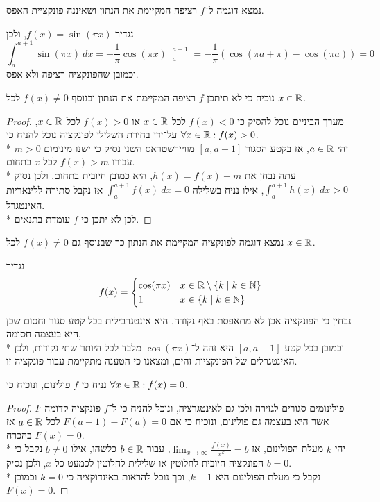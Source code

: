 \Subquestion{}
נמצא דוגמה ל־$f$ רציפה המקיימת את הנתון ושאיננה פונקציית האפס.

נגדיר $f(x) = \sin(\pi x)$, ולכן
\[
	\int_{a}^{a + 1} \sin(\pi x)\ dx
	= -\frac{1}{\pi} \cos(\pi x) \mid_a^{a + 1}
	= - \frac{1}{\pi} ( \cos(\pi a + \pi) - \cos(\pi a))
	= 0
\]
וכמובן שהפונקציה רציפה ולא אפס.

\Subquestion{}
נוכיח כי לא תיתכן $f$ רציפה המקיימת את הנתון ובנוסף $f(x) \ne 0$ לכל $x \in \mathbb{R}$.
\begin{proof}
	מערך הביניים נוכל להסיק כי $f(x) < 0$ לכל $x \in \mathbb{R}$ או $f(x) > 0$ לכל $x \in \mathbb{R}$, על־ידי בחירת השלילי לפונקציה נוכל להניח כי $\forall x \in \mathbb{R} : f(x) > 0$. \\*
	יהי $a \in \mathbb{R}$, אז בקטע הסגור $[a, a + 1]$ מוויירשטראס השני נסיק כי ישנו מינימום $m > 0$ עבורו $f(x) > m$ לכל $x$ בתחום. \\*
	עתה נבחן את $h(x) = f(x) - m$, היא כמובן חיובית בתחום, ולכן נסיק $\int_{a}^{a + 1} h(x)\ dx > 0$, אילו נניח בשלילה $\int_{a}^{a + 1} f(x)\ dx = 0$ אז נקבל סתירה ללינאריות האינטגרל. \\*
	לכן לא יתכן כי $f$ עומדת בתנאים.
\end{proof}

\Subquestion{}
נמצא דוגמה לפונקציה המקיימת את הנתון כך שבנוסף גם $f(x) \ne 0$ לכל $x \in \mathbb{R}$.

נגדיר
\[
	f(x) = \begin{cases}
		\cos(\pi x) & x \in \mathbb{R} \setminus \{ k \mid k \in \mathbb{N} \} \\
		1 & x \in \{ k \mid k \in \mathbb{N} \} \\
	\end{cases}
\]
נבחין כי הפונקציה אכן לא מתאפסת באף נקודה, היא אינטגרבילית בכל קטע סגור וחסום שכן היא בעצמה חסומה, \\*
וכמובן בכל קטע $[a, a + 1]$ היא זהה ל־$\cos(\pi x)$ מלבד לכל היותר שתי נקודות, ולכן האינטגרלים של הפונקציות זהים, ומצאנו כי הטענה מתקיימת עבור פונקציה זו.

\Subquestion{}
נניח כי $f$ פולינום, ונוכיח כי $\forall x \in \mathbb{R} : f(x) = 0$.
\begin{proof}
	פולינומים סגורים לגזירה ולכן גם לאינטגרציה, ונוכל להניח כי ל־$f$ פונקציה קדומה $F$ אשר היא בעצמה גם פולינום, ונוכיח כי אם $F(a + 1) - F(a) = 0$ לכל $a \in \mathbb{R}$ אז בהכרח $F(x) = 0$. \\*
	יהי $k$ מעלת הפולינום, אז $\lim_{x \to \infty} \frac{f(x)}{x^k} = b$, עבור $b \in \mathbb{R}$ כלשהו, אילו $b \ne 0$ נקבל כי הפונקציה חיובית לחלוטין או שלילית לחלוטין לכמעט כל $x$, ולכן נסיק $b = 0$. \\*
	נקבל כי מעלת הפולינום היא $k - 1$, וכך נוכל להראות באינדוקציה כי $k = 0$ וכמובן $F(x) = 0$.
\end{proof}

